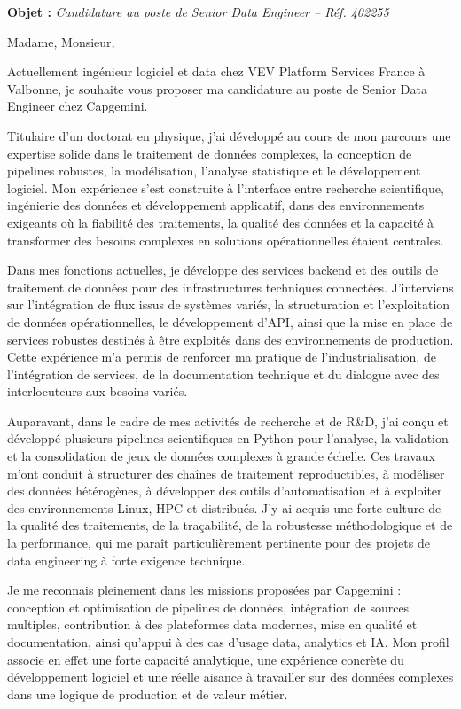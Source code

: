 \documentclass[11pt,a4paper]{../_shared/altacv}
\begin{document}
\makecvheader

{\color{accent}\textbf{Objet :}} \textit{Candidature au poste de Senior Data Engineer -- Réf. 402255}

{\color{body}

Madame, Monsieur,

Actuellement ingénieur logiciel et data chez VEV Platform Services France à Valbonne, je souhaite vous proposer ma candidature au poste de Senior Data Engineer chez Capgemini.

Titulaire d’un doctorat en physique, j’ai développé au cours de mon parcours une expertise solide dans le traitement de données complexes, la conception de pipelines robustes, la modélisation, l’analyse statistique et le développement logiciel. Mon expérience s’est construite à l’interface entre recherche scientifique, ingénierie des données et développement applicatif, dans des environnements exigeants où la fiabilité des traitements, la qualité des données et la capacité à transformer des besoins complexes en solutions opérationnelles étaient centrales.

Dans mes fonctions actuelles, je développe des services backend et des outils de traitement de données pour des infrastructures techniques connectées. J’interviens sur l’intégration de flux issus de systèmes variés, la structuration et l’exploitation de données opérationnelles, le développement d’API, ainsi que la mise en place de services robustes destinés à être exploités dans des environnements de production. Cette expérience m’a permis de renforcer ma pratique de l’industrialisation, de l’intégration de services, de la documentation technique et du dialogue avec des interlocuteurs aux besoins variés.

Auparavant, dans le cadre de mes activités de recherche et de R\&D, j’ai conçu et développé plusieurs pipelines scientifiques en Python pour l’analyse, la validation et la consolidation de jeux de données complexes à grande échelle. Ces travaux m’ont conduit à structurer des chaînes de traitement reproductibles, à modéliser des données hétérogènes, à développer des outils d’automatisation et à exploiter des environnements Linux, HPC et distribués. J’y ai acquis une forte culture de la qualité des traitements, de la traçabilité, de la robustesse méthodologique et de la performance, qui me paraît particulièrement pertinente pour des projets de data engineering à forte exigence technique.

Je me reconnais pleinement dans les missions proposées par Capgemini : conception et optimisation de pipelines de données, intégration de sources multiples, contribution à des plateformes data modernes, mise en qualité et documentation, ainsi qu’appui à des cas d’usage data, analytics et IA. Mon profil associe en effet une forte capacité analytique, une expérience concrète du développement logiciel et une réelle aisance à travailler sur des données complexes dans une logique de production et de valeur métier.

}
\end{document}
